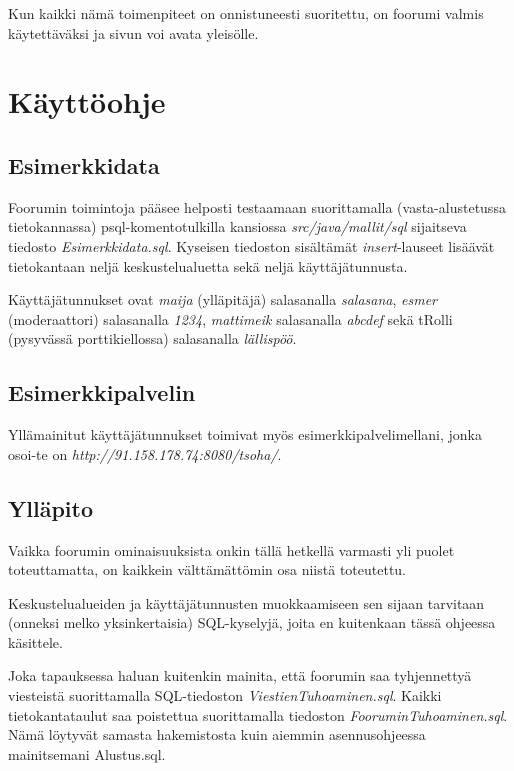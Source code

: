 \documentclass[11pt]{article}
\begin{document}
			Kun kaikki nämä toimenpiteet on onnistuneesti suoritettu, on foorumi valmis käytettäväksi ja sivun
			voi avata yleisölle.
		
\newpage
\thispagestyle{plain}
	\section{Käyttöohje}
		\subsection{Esimerkkidata}
			Foorumin toimintoja pääsee helposti testaamaan suorittamalla (vasta-alustetussa tietokannassa)
			psql-komentotulkilla kansiossa \emph{src/java/mallit/sql} sijaitseva tiedosto
			\emph{Esimerkkidata.sql}. Kyseisen tiedoston sisältämät \emph{insert}-lauseet lisäävät
			tietokantaan neljä keskustelualuetta sekä neljä käyttäjätunnusta.
		
			Käyttäjätunnukset ovat \emph{maija} (ylläpitäjä) salasanalla \emph{salasana}, \emph{esmer}
			(moderaattori) salasanalla \emph{1234}, \emph{mattimeik} salasanalla \emph{abcdef} sekä tRolli
			(pysyvässä porttikiellossa) salasanalla \emph{lällispöö}.
		
		\subsection{Esimerkkipalvelin}
			Yllämainitut käyttäjätunnukset toimivat myös esimerkkipalvelimellani, jonka osoi-te on
			\emph{http://91.158.178.74:8080/tsoha/}.
			
		
		\subsection{Ylläpito}
			Vaikka foorumin ominaisuuksista onkin tällä hetkellä varmasti yli puolet toteuttamatta, on
			kaikkein välttämättömin osa niistä toteutettu.
			
			Keskustelualueiden ja käyttäjätunnusten muokkaamiseen sen sijaan tarvitaan (onneksi melko
			yksinkertaisia) SQL-kyselyjä, joita en kuitenkaan tässä ohjeessa käsittele.
			
			Joka tapauksessa haluan kuitenkin mainita, että foorumin saa tyhjennettyä viesteistä suorittamalla
			SQL-tiedoston \emph{ViestienTuhoaminen.sql}. Kaikki tietokantataulut saa poistettua suorittamalla
			tiedoston \emph{FooruminTuhoaminen.sql}. Nämä löytyvät samasta hakemistosta kuin aiemmin
			asennusohjeessa mainitsemani Alustus.sql.			
		
\newpage
\thispagestyle{plain}
\end{document}
